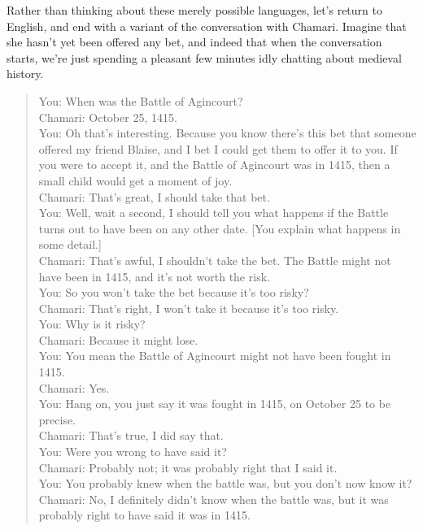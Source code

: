 \documentclass[
  12pt,
  letterpaper,
]{scrbook}
\begin{document}
Rather than thinking about these merely possible languages, let's return
to English, and end with a variant of the conversation with Chamari.
Imagine that she hasn't yet been offered any bet, and indeed that when
the conversation starts, we're just spending a pleasant few minutes idly
chatting about medieval history.

\begin{quote}
You: When was the Battle of Agincourt?\\
Chamari: October 25, 1415.\\
You: Oh that's interesting. Because you know there's this bet that
someone offered my friend Blaise, and I bet I could get them to offer it
to you. If you were to accept it, and the Battle of Agincourt was in
1415, then a small child would get a moment of joy.\\
Chamari: That's great, I should take that bet.\\
You: Well, wait a second, I should tell you what happens if the Battle
turns out to have been on any other date. {[}You explain what happens in
some detail.{]}\\
Chamari: That's awful, I shouldn't take the bet. The Battle might not
have been in 1415, and it's not worth the risk.\\
You: So you won't take the bet because it's too risky?\\
Chamari: That's right, I won't take it because it's too risky.\\
You: Why is it risky?\\
Chamari: Because it might lose.\\
You: You mean the Battle of Agincourt might not have been fought in
1415.\\
Chamari: Yes.\\
You: Hang on, you just say it was fought in 1415, on October 25 to be
precise.\\
Chamari: That's true, I did say that.\\
You: Were you wrong to have said it?\\
Chamari: Probably not; it was probably right that I said it.\\
You: You probably knew when the battle was, but you don't now know it?\\
Chamari: No, I definitely didn't know when the battle was, but it was
probably right to have said it was in 1415.
\end{quote}
\end{document}

